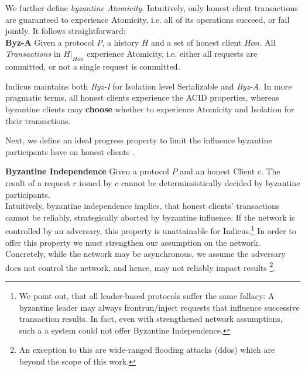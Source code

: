 We further define \textit{byzantine Atomicity}. Intuitively, only honest client transactions are guaranteed to experience Atomicity, i.e. all of its operations succeed, or fail jointly. It follows straightforward:\\
\textbf{Byz-A} Given a protocol $P$, a history $H$ and a set of honest client $Hon$. All \textit{Transactions} in $H|_{Hon}$ experience Atomicity, i.e. either all requests are committed, or not a single request is committed.\\

Indicus maintains both \textit{Byz-I} for Isolation level Serializable and \textit{Byz-A}. 
In more pragmatic terms, all honest clients experience the ACID properties, whereas byzantine clients may \textbf{choose} whether to experience Atomicity and Isolation for their transactions.

Next, we define an ideal progress property to limit the influence byzantine participants have on honest clients . 

\textbf{Byzantine Independence}
Given a protocol $P$ and an honest Client $c$. The result of a request $r$ issued by $c$ cannot be determinsistically decided by byzantine participants.  \\

Intuitively, byzantine independence implies, that honest clients' transactions cannot be reliably, strategically aborted by byzantine influence.
If the network is controlled by an adversary, this property is unattainable for Indicus.\footnote{We point out, that all leader-based protocols suffer the same fallacy: A byzantine leader may always frontrun/inject requests that influence successive transaction results. In fact, even with strengthened network assumptions, such a a system could not offer Byzantine Independence. } 
In order to offer this property we must strengthen our assumption on the network. Concretely, while the network may be asynchronous, we assume the adversary does not control the network, and hence, may not reliably impact results \footnote{An exception to this are wide-ranged flooding attacks (ddos) which are beyond the scope of this work.}. 

